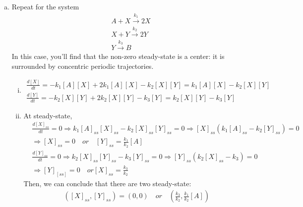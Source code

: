 \documentclass[paper=a4, fontsize=11pt]{scrartcl} %
\numberwithin{equation}{section} %
\numberwithin{figure}{section} %
\numberwithin{table}{section} %
\begin{document}
\begin{enumerate}[a)]
\begin{enumerate}[i)]
		\end{enumerate}
		\item Repeat for the system
		\begin{gather*}
			A + X \xrightarrow{k_1} 2X \\
			X + Y \xrightarrow{k_2} 2Y \\
			Y \xrightarrow{k_3} B
		\end{gather*}
		In this case, you'll find that the non-zero steady-state is a center: it is surrounded by concentric periodic trajectories.
		\begin{enumerate}[i)]
			\item
			\begin{gather*}
				\frac{d[X]}{dt} = -k_1[A][X]+2k_1[A][X]-k_2[X][Y]=k_1[A][X]-k_2[X][Y]\\
				\frac{d[Y]}{dt} = -k_2[X][Y]+2k_2[X][Y]-k_3[Y] = k_2[X][Y]-k_3[Y]
			\end{gather*}

			\item
			At steady-state,
			\begin{align*}
				&\frac{d[X]_{ss}}{dt}=0 \Rightarrow k_1[A]_{ss}[X]_{ss}-k_2[X]_{ss}[Y]_{ss}=0 \Rightarrow [X]_{ss}(k_1[A]_{ss}-k_2[Y]_{ss})=0 \\
				&\Rightarrow [X]_{ss}=0 \quad or \quad [Y]_{ss}=\frac{k_1}{k_2}[A]\\
				&\frac{d[Y]_{ss}}{dt}=0 \Rightarrow k_2[X]_{ss}[Y]_{ss}-k_3[Y]_{ss}=0 \Rightarrow [Y]_{ss}(k_2[X]_{ss}-k_3)=0 \\
				&\Rightarrow [Y]_[ss] = 0 \quad or [X]_{ss}=\frac{k_3}{k_2}
			\end{align*}
			Then, we can conclude that there are two steady-state:
			\begin{align*}
				([X]_{ss},[Y]_{ss})=(0,0) \quad or \quad (\frac{k_3}{k_2},\frac{k_1}{k_2}[A])
			\end{align*}


\end{enumerate}
\end{enumerate}
\end{document}

